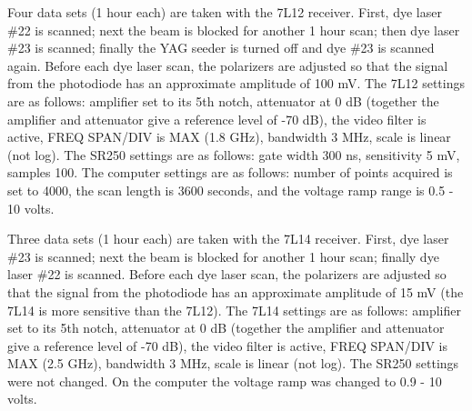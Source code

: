 Four data sets (1 hour each) are taken with the 7L12 receiver. First, dye laser \#22 is scanned; next the beam is blocked for another 1 hour scan; then dye laser \#23 is scanned; finally the YAG seeder is turned off and dye \#23 is scanned again. Before each dye laser scan, the polarizers are adjusted so that the signal from the photodiode has an approximate amplitude of 100 mV. The 7L12 settings are as follows: amplifier set to its 5th notch, attenuator at 0 dB (together the amplifier and attenuator give a reference level of -70 dB), the video filter is active, FREQ SPAN/DIV is MAX (1.8 GHz), bandwidth 3 MHz, scale is linear (not log). The SR250 settings are as follows: gate width 300 ns, sensitivity 5 mV, samples 100. The computer settings are as follows: number of points acquired is set to 4000, the scan length is 3600 seconds, and the voltage ramp range is 0.5 - 10 volts.

Three data sets (1 hour each) are taken with the 7L14 receiver. First, dye laser \#23 is scanned; next the beam is blocked for another 1 hour scan; finally dye laser \#22 is scanned. Before each dye laser scan, the polarizers are adjusted so that the signal from the photodiode has an approximate amplitude of 15 mV (the 7L14 is more sensitive than the 7L12). The 7L14 settings are as follows: amplifier set to its 5th notch, attenuator at 0 dB (together the amplifier and attenuator give a reference level of -70 dB), the video filter is active, FREQ SPAN/DIV is MAX (2.5 GHz), bandwidth 3 MHz, scale is linear (not log). The SR250 settings were not changed. On the computer the voltage ramp was changed to 0.9 - 10 volts.

